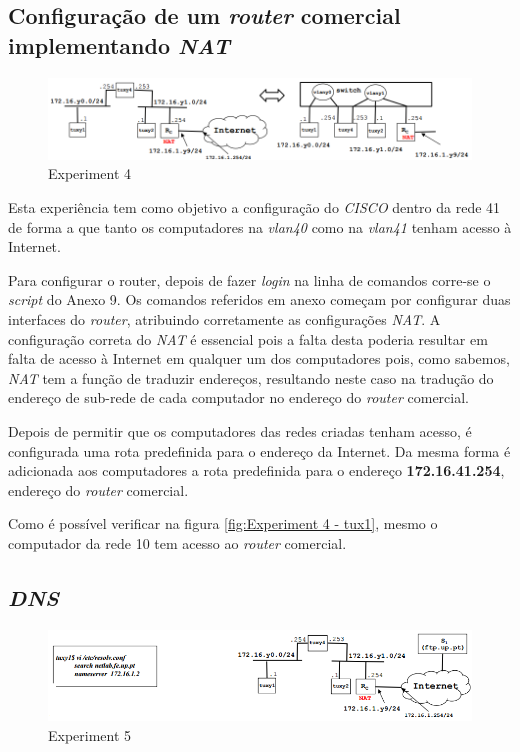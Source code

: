 \documentclass[a4paper]{article}
\begin{document}
	\subsection{Configuração de um \textit{router} comercial implementando \textit{NAT}}

	\begin{figure}[H]
	\begin{center}
  	\includegraphics[width=0.8\linewidth]{exp4.png}
  	\caption{Experiment 4}
  	\label{fig:Experiment 4}
	\end{center}
	\end{figure}

	Esta experiência tem como objetivo a configuração do \textit{CISCO} dentro da rede 41 de forma a que tanto os computadores na \textit{vlan40} como na \textit{vlan41} tenham acesso à Internet.

	Para configurar o router, depois de fazer \textit{login} na linha de comandos corre-se o \textit{script} do Anexo 9. Os comandos referidos em anexo começam por configurar duas interfaces do \textit{router}, atribuindo corretamente as configurações \textit{NAT}. A configuração correta do \textit{NAT} é essencial pois a falta desta poderia resultar em falta de acesso à Internet em qualquer um dos computadores pois, como sabemos, \textit{NAT} tem a função de traduzir endereços, resultando neste caso na tradução do endereço de sub-rede de cada computador no endereço do \textit{router} comercial.
	
	Depois de permitir que os computadores das redes criadas tenham acesso, é configurada uma rota predefinida para o endereço da Internet. Da mesma forma é adicionada aos computadores a rota predefinida para o endereço \textbf{172.16.41.254}, endereço do \textit{router} comercial.

	Como é possível verificar na figura \ref{fig:Experiment 4 - tux1}, mesmo o computador da rede 10 tem acesso ao \textit{router} comercial.

	\subsection{\textit{DNS}}

	\begin{figure}[H]
	\begin{center}
  	\includegraphics[width=0.8\linewidth]{exp5.png}
  	\caption{Experiment 5}
  	\label{fig:Experiment 5}
	\end{center}
	\end{figure}
\end{document}
